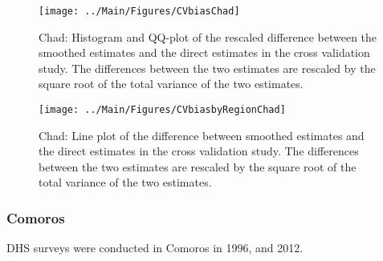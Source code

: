\documentclass[12pt]{article}\usepackage[]{graphicx}\usepackage[]{color}
\newenvironment{knitrout}{}{} %
\begin{document}
\begin{knitrout}
\color{fgcolor}\begin{figure}[bht]

{\centering \texttt{[image: ../Main/Figures/CVbiasChad]} 

}

\caption[Chad]{Chad: Histogram and QQ-plot of the rescaled difference between the smoothed estimates and the direct estimates in the cross validation study. The differences between the two estimates are rescaled by the square root of the total variance of the two estimates.}\label{fig:unnamed-chunk-59}
\end{figure}


\end{knitrout}

\begin{knitrout}
\color{fgcolor}\begin{figure}[bht]

{\centering \texttt{[image: ../Main/Figures/CVbiasbyRegionChad]} 

}

\caption[Chad]{Chad: Line plot of the difference between smoothed estimates and the direct estimates in the cross validation study. The differences between the two estimates are rescaled by the square root of the total variance of the two estimates.}\label{fig:unnamed-chunk-60}
\end{figure}


\end{knitrout}

\clearpage
\subsubsection{Comoros}





DHS surveys were conducted in Comoros in 1996, and 2012.
\end{document}
